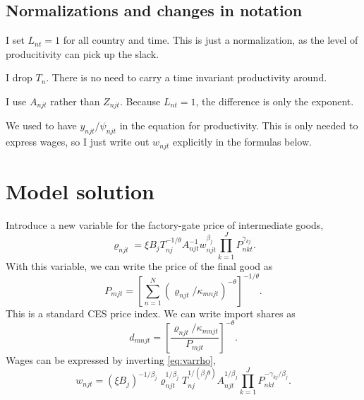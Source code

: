 \documentclass[12pt]{article}
\begin{document}
\subsection*{Normalizations and changes in notation}
I set $L_{nt}=1$ for all country and time. This is just a normalization, as the level of producitivity can pick up the slack.

I drop $T_n$. There is no need to carry a time invariant productivity around.

I use $A_{njt}$ rather than $Z_{njt}$. Because $L_{nt}=1$, the difference is only the exponent.

We used to have $y_{njt}/\psi_{njt}$ in the equation for productivity. This is only needed to express wages, so I just write out $w_{njt}$ explicitly in the formulas below.
\section{Model solution}
Introduce a new variable for the factory-gate price of intermediate goods,
\begin{equation}\label{eq:varrho}
	\varrho_{njt} = \xi B_j T_{nj}^{-1/\theta} A_{njt}^{-1} w_{njt}^{\beta_j} \prod_{k=1}^J P_{nkt}^{\gamma_{kj}}.
\end{equation}
With this variable, we can write the price of the final good as
\begin{equation}\label{eq:price}
	P_{mjt} = \left[
		\sum_{n=1}^N (\varrho_{njt}/\kappa_{mnjt})^{-\theta}
		\right]^{-1/\theta}.
\end{equation}
This is a standard CES price index. We can write import shares as
\begin{equation}\label{eq:import_share}
	d_{mnjt} = \left[
	\frac
	{\varrho_{njt}/\kappa_{mnjt}}
	{P_{mjt}}
	\right]^{-\theta}.
\end{equation}
Wages can be expressed by inverting \eqref{eq:varrho},
\begin{equation}\label{eq:wage}
	w_{njt} = (\xi B_j)^{-1/\beta_j}
	\varrho_{njt}^{1/\beta_j}  
	T_{nj}^{1/(\beta_j\theta)}A_{njt}^{1/\beta_j} 
	\prod_{k=1}^J P_{nkt}^{-\gamma_{kj}/\beta_j}.
\end{equation}
\end{document}
